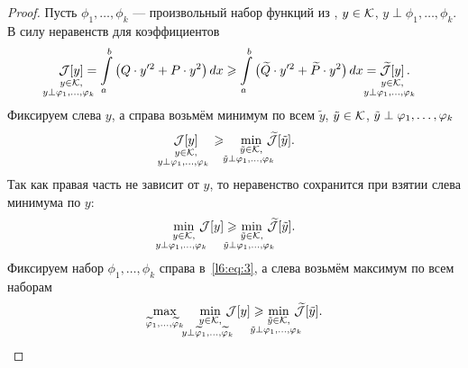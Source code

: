 \begin{proof}
	Пусть $\phi_1,\ldots,\phi_k$ --- произвольный набор функций из \fL, $y\in\mathcal{K}$, $y\perp\phi_1,\ldots,\phi_k$. В силу неравенств для коэффициентов
	\begin{equation}
		\label{l6:eq:1}
		 \mathop{\J[y]}\limits_{\substack{y\in\K,\\\lefteqn{\scriptstyle \hspace*{-0.8cm}y\perp\phi_1,\ldots,\phi_{k}}}}=\int\limits_a^b\big(Q\cdot y'^2+P\cdot y^2\big)\,dx\geqslant\int\limits_a^b\big(\widetilde{Q}\cdot y'^2+\widetilde{P}\cdot y^2\big)\,dx=\mathop{\widetilde{\J}[y]}\limits_{\substack{y\in\K,\\\lefteqn{\scriptstyle \hspace*{-0.8cm}y\perp\phi_1,\ldots,\phi_{k}}}}.
	\end{equation}
	Фиксируем слева $y$, а справа возьмём минимум по всем $\tilde{y}$, $\tilde{y}\in\mathcal{K}$, $\tilde{y}\?\perp \phi_1,\ldots,\phi_k$
	\begin{equation}
		\label{l6:eq:2}
		\mathop{\J[y]}\limits_{\substack{y\in\K,\\\lefteqn{\scriptstyle \hspace*{-0.8cm}y\perp\phi_1,\ldots,\phi_{k}}}}\quad\geqslant\quad\min\limits_{\substack{\tilde{y}\in\K,\\\lefteqn{\scriptstyle \hspace*{-0.8cm}\tilde{y}\perp\phi_1,\ldots,\phi_{k}}}}\,\widetilde{\J}[\tilde{y}].
	\end{equation}
	Так как правая часть не зависит от $y$, то неравенство сохранится при взятии слева минимума по $y$:
	\begin{equation}
		\label{l6:eq:3}
		\min\limits_{\substack{y\in\K,\\\lefteqn{\scriptstyle \hspace*{-0.8cm}y\perp\phi_1,\ldots,\phi_{k}}}}\,\J[y]\geqslant\min\limits_{\substack{\tilde{y}\in\K,\\\lefteqn{\scriptstyle \hspace*{-0.8cm}\tilde{y}\perp\phi_1,\ldots,\phi_{k}}}}\,\widetilde{\J}[\tilde{y}].
	\end{equation}
	Фиксируем набор $\phi_1,\ldots,\phi_k$ справа в~\eqref{l6:eq:3}, а слева возьмём максимум по всем наборам
	\begin{equation}
		\label{l6:eq:4}
		\max\limits_{\widetilde{\phi}_1,\ldots,\widetilde{\phi}_k}\quad\min\limits_{\substack{y\in\K,\\\lefteqn{\scriptstyle \hspace*{-0.8cm}y\perp\widetilde{\phi}_1,\ldots,\widetilde{\phi}_{k}}}}\,\J[y]\geqslant\min\limits_{\substack{\tilde{y}\in\K,\\\lefteqn{\scriptstyle \hspace*{-0.8cm}\tilde{y}\perp\phi_1,\ldots,\phi_{k}}}}\,\widetilde{\J}[\tilde{y}].

\end{equation}
\end{proof}
